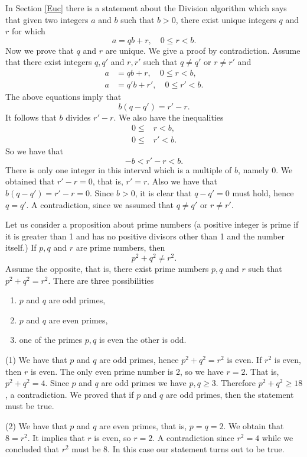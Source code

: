 In Section \ref{Euc} there is a statement about the Division algorithm which says that given two integers $a$ and $b$ such that $b>0$, 
there exist unique integers $q$ and $r$ for which 
$$
a=qb+r,\quad 0\leq r<b.
$$
Now we prove that $q$ and $r$ are unique. We give a proof by contradiction. Assume that there exist integers $q,q'$ and $r,r'$ such that
$q\neq q'$ or $r\neq r'$ and 
\begin{align*}
a&=qb+r,\quad 0\leq r<b,\\
a&=q'b+r',\quad 0\leq r'<b.
\end{align*}
The above equations imply that 
$$
b(q-q')=r'-r.
$$
It follows that $b$ divides $r'-r$. We also have the inequalities
\begin{align*}
0\leq &r<b,\\
0\leq &r'<b.
\end{align*}
So we have that 
$$
-b<r'-r<b.
$$
There is only one integer in this interval which is a multiple of $b$, namely 0. We obtained that $r'-r=0$, that is, $r'=r$.
Also we have that $b(q-q')=r'-r=0$. Since $b>0$, it is clear that $q-q'=0$ must hold, hence $q=q'$. A contradiction, since we 
assumed that $q\neq q'$ or $r\neq r'$.

Let us consider a proposition about prime numbers (a positive integer is prime if it is greater than 1 and has no positive divisors other than 1 and the number itself.)
If $p,q$ and $r$ are prime numbers, then 
$$
p^2+q^2\neq r^2.
$$
Assume the opposite, that is, there exist prime numbers $p,q$ and $r$ such that $p^2+q^2=r^2$. There are three possibilities
\begin{enumerate}
\item[(1)] $p$ and $q$ are odd primes,
\item[(2)] $p$ and $q$ are even primes,
\item[(3)] one of the primes $p,q$ is even the other is odd.
\end{enumerate}

(1) We have that $p$ and $q$ are odd primes, hence $p^2+q^2=r^2$ is even. If $r^2$ is even, then $r$ is even.
The only even prime number is 2, so we have $r=2$. That is, $p^2+q^2=4$. Since $p$ and $q$ are odd primes we have $p,q\geq 3$.
Therefore $p^2+q^2\geq 18$, a contradiction. We proved that if $p$ and $q$ are odd primes, then the statement must be true.

(2) We have that $p$ and $q$ are even primes, that is, $p=q=2$. We obtain that $8=r^2$. It implies that $r$ is even, so $r=2$.
A contradiction since $r^2=4$ while we concluded that $r^2$ must be 8. In this case our statement turns out to be true.

